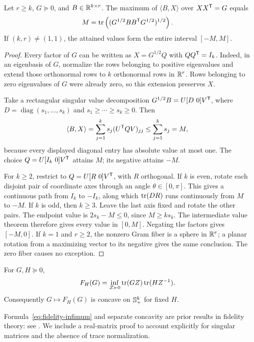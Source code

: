 \begin{lemma}\label{lem:gram-range}
Let $r\geq k$, $G\succeq0$, and $B\in\mathbb R^{k\times r}$. The maximum
of $\langle B,X\rangle$ over $XX^{\mathsf T}=G$ equals
\[
 M=\operatorname{tr}\left((G^{1/2}BB^{\mathsf T} G^{1/2})^{1/2}\right).
\]
If $(k,r)\ne(1,1)$, the attained values form the entire interval
$[-M,M]$.
\end{lemma}
\begin{proof}
Every factor of $G$ can be written as $X=G^{1/2}Q$ with
$QQ^{\mathsf T}=I_k$. Indeed, in an eigenbasis of $G$, normalize the
rows belonging to positive eigenvalues and extend those orthonormal
rows to $k$ orthonormal rows in $\mathbb R^r$. Rows belonging to zero
eigenvalues of $G$ were already zero, so this extension preserves $X$.

Take a rectangular singular value decomposition
$G^{1/2}B=U[D\ 0]V^{\mathsf T}$, where
$D=\operatorname{diag}(s_1,\ldots,s_k)$ and
$s_1\geq\cdots\geq s_k\geq0$. Then
\[
 \langle B,X\rangle
 =\sum_{j=1}^k s_j(U^{\mathsf T} QV)_{jj}
 \leq\sum_{j=1}^k s_j=M,
\]
because every displayed diagonal entry has absolute value at most one.
The choice $Q=U[I_k\ 0]V^{\mathsf T}$ attains $M$; its negative
attains $-M$.

For $k\geq2$, restrict to $Q=U[R\ 0]V^{\mathsf T}$, with $R$
orthogonal. If $k$ is even, rotate each disjoint pair of coordinate
axes through an angle $\theta\in[0,\pi]$. This gives a continuous
path from $I_k$ to $-I_k$, along which $\operatorname{tr}(DR)$ runs continuously
from $M$ to $-M$. If $k$ is odd, then $k\geq3$. Leave the last axis
fixed and rotate the other pairs. The endpoint value is
$2s_k-M\leq0$, since $M\geq ks_k$. The intermediate value theorem
therefore gives every value in $[0,M]$. Negating the factors gives
$[-M,0]$. If $k=1$ and $r\geq2$, the nonzero Gram fiber is a sphere
in $\mathbb R^r$; a planar rotation from a maximizing vector to its negative
gives the same conclusion. The zero fiber causes no exception.
\end{proof}

\begin{lemma}\label{lem:fidelity-concavity}
For $G,H\succeq0$,
\begin{equation}\label{eq:fidelity-infimum}
 F_H(G)=\inf_{Z\succ0}\operatorname{tr}(GZ)\operatorname{tr}(HZ^{-1}).
\end{equation}
Consequently $G\mapsto F_H(G)$ is concave on $\mathbb S^k_+$ for fixed $H$.
\end{lemma}

Formula~\eqref{eq:fidelity-infimum} and separate concavity are prior
results in fidelity theory: see \citet[pp.~408--410, equation~(14) with
the partial-fidelity index equal to zero]{Uhlmann2000}. We include a
real-matrix proof to account explicitly for singular matrices and the
absence of trace normalization.

